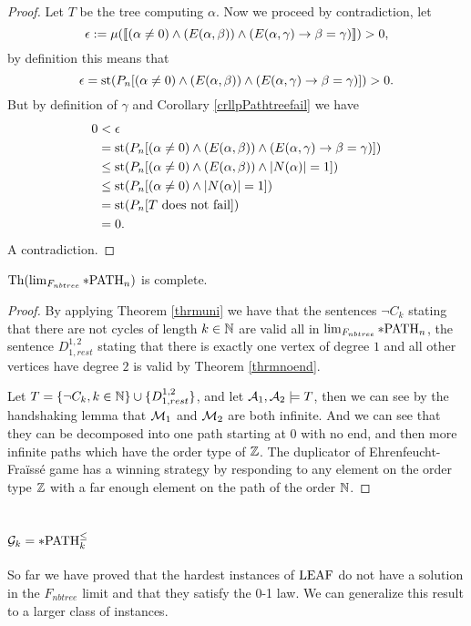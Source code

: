 \begin{proof}
Let $T$ be the tree computing $\alpha$. Now we proceed by contradiction, let
\[\epsilon:=\mu([\![(\alpha\not=0)\land (E(\alpha,\beta)) \land(E(\alpha,\gamma) \to \beta=\gamma)]\!])>0,\]
by definition this means that
\[\epsilon=\text{st}(P_n[(\alpha\not=0)\land (E(\alpha,\beta)) \land(E(\alpha,\gamma) \to \beta=\gamma)])>0.\]
But by definition of $\gamma$ and Corollary \ref{crllpPathtreefail} we have
\begin{align*}
0&<\epsilon\\
&=\text{st}(P_n[(\alpha\not=0)\land (E(\alpha,\beta)) \land(E(\alpha,\gamma) \to \beta=\gamma)])\\
&\leq\text{st}(P_n[(\alpha\not=0)\land (E(\alpha,\beta)) \land \left|{N(\alpha)}\right|=1])\\
&\leq\text{st}(P_n[(\alpha\not=0)\land \left|{N(\alpha)}\right|=1])\\
&=\text{st}(P_n[T\text{ does not fail}])\\
&=0.
\end{align*}
A contradiction.
\end{proof}

\begin{crll}\label{crllpPATH}
$\text{Th}(\lim_{F_{nbtree}}*\text{PATH}_n)$ is complete.
\end{crll}
\begin{proof}
By applying Theorem \ref{thrmuni} we have that the sentences $\lnot C_k$ stating that there are not cycles of length $k\in\mathbb{N}$ are valid all in $\lim_{F_{nbtree}}*\text{PATH}_n$, the sentence $D^{1,2}_{1,rest}$ stating that there is exactly one vertex of degree $1$ and all other vertices have degree $2$ is valid by Theorem \ref{thrmnoend}. 

Let $T=\{\lnot C_k,k\in\mathbb{N}\}\cup\{D_{1,rest}^{1,2}\}$, and let $\mathcal{A}_1,\mathcal{A}_2\models T$, then we can see by the handshaking lemma that $\mathcal{M}_1$ and $\mathcal{M}_2$ are both infinite. And we can see that they can be decomposed into one path starting at $0$ with no end, and then more infinite paths which have the order type of $\mathbb{Z}$. The duplicator of Ehrenfeucht-Fraïssé game has a winning strategy by responding to any element on the order type $\mathbb{Z}$ with a far enough element on the path of the order $\mathbb{N}$.
\end{proof}

\section{\texorpdfstring{$\mathcal{G}_k=*\text{PATH}^\leq_k$}{Gk=*PATHlk}}

So far we have proved that the hardest instances of $\text{LEAF}$ do not have a solution in the $F_{nbtree}$ limit and that they satisfy the 0-1 law. We can generalize this result to a larger class of instances.


